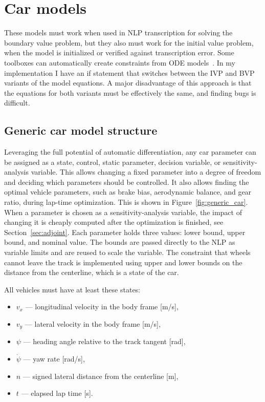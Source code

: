 \section{Car models}
These models must work when used in NLP transcription for solving the boundary value problem, but they also must work for the initial value problem, when the model is initialized or verified against transcription error. Some toolboxes can automatically create constraints from ODE models~\cite{wilhelm2022eago}. In my implementation I have an if statement that switches between the IVP and BVP variants of the model equations. A major disadvantage of this approach is that the equations for both variants must be effectively the same, and finding bugs is difficult.
\subsection{Generic car model structure}
Leveraging the full potential of automatic differentiation, any car parameter can be assigned as a state, control, static parameter, decision variable, or sensitivity-analysis variable. This allows changing a fixed parameter into a degree of freedom and deciding which parameters should be controlled. It also allows finding the optimal vehicle parameters, such as brake bias, aerodynamic balance, and gear ratio, during lap-time optimization. This is shown in Figure~\ref{fig:generic_car}. When a parameter is chosen as a sensitivity-analysis variable, the impact of changing it is cheaply computed after the optimization is finished, see Section~\ref{sec:adjoint}. Each parameter holds three values: lower bound, upper bound, and nominal value. The bounds are passed directly to the NLP as variable limits and are reused to scale the variable. The constraint that wheels cannot leave the track is implemented using upper and lower bounds on the distance from the centerline, which is a state of the car.

All vehicles must have at least these states:
\begin{itemize}
    \item $v_x$ — longitudinal velocity in the body frame [m/s],
    \item $v_y$ — lateral velocity in the body frame [m/s],
    \item $\psi$ — heading angle relative to the track tangent [rad],
    \item $\dot{\psi}$ — yaw rate [rad/s],
    \item $n$ — signed lateral distance from the centerline [m],
    \item $t$ — elapsed lap time [s].
\end{itemize}


